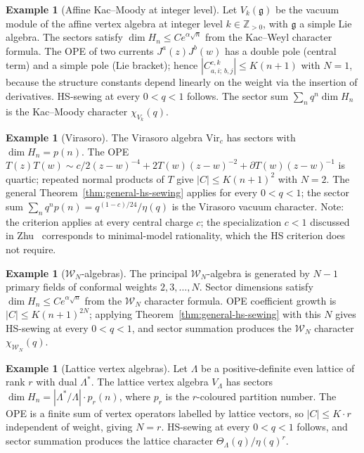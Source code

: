 \documentclass[11pt,reqno]{amsart}
\theoremstyle{definition}
\newtheorem{example}[theorem]{Example}
\theoremstyle{remark}
\newcommand{\cW}{\mathcal{W}}
\newcommand{\Vir}{\mathrm{Vir}}
\newcommand{\fg}{\mathfrak{g}}
\numberwithin{equation}{section}
\begin{document}
\begin{example}[Affine Kac--Moody at integer level]
\label{ex:kac-moody}
Let $V_k(\fg)$ be the vacuum module of the affine vertex algebra
at integer level $k \in \mathbb{Z}_{> 0}$, with $\fg$ a simple
Lie algebra. The sectors satisfy
$\dim H_n \leq C e^{\alpha\sqrt n}$ from the Kac--Weyl character
formula. The OPE of two currents
$J^a(z)J^b(w)$ has a double pole (central term) and a simple
pole (Lie bracket); hence
$|C^{c,k}_{a,i;\,b,j}| \leq K(n+1)$ with $N = 1$, because the
structure constants depend linearly on the weight via the
insertion of derivatives. HS-sewing at every $0 < q < 1$
follows. The sector sum
$\sum_n q^n\dim H_n$ is the Kac--Moody character $\chi_{V_k}(q)$.
\end{example}

\begin{example}[Virasoro]\label{ex:virasoro}
The Virasoro algebra $\Vir_c$ has sectors with
$\dim H_n = p(n)$. The OPE
$T(z)T(w) \sim c/2(z-w)^{-4} + 2T(w)(z-w)^{-2}
+ \partial T(w)(z-w)^{-1}$
is quartic; repeated normal products of $T$ give
$|C| \leq K(n+1)^2$ with $N = 2$. The general
Theorem~\ref{thm:general-hs-sewing} applies for every
$0 < q < 1$; the sector sum
$\sum_n q^n p(n) = q^{(1-c)/24}/\eta(q)$
is the Virasoro vacuum character. Note: the criterion
applies at every central charge $c$; the specialization
$c < 1$ discussed in Zhu~\cite{Zhu96} corresponds to
minimal-model rationality, which the HS criterion does not
require.
\end{example}

\begin{example}[$\cW_N$-algebras]\label{ex:wn}
The principal $\cW_N$-algebra is generated by $N - 1$ primary
fields of conformal weights $2, 3, \ldots, N$. Sector
dimensions satisfy $\dim H_n \leq C e^{\alpha\sqrt n}$ from
the $\cW_N$ character formula. OPE coefficient growth is
$|C| \leq K(n+1)^{2N}$; applying
Theorem~\ref{thm:general-hs-sewing} with this $N$ gives
HS-sewing at every $0 < q < 1$, and sector summation
produces the $\cW_N$ character $\chi_{\cW_N}(q)$.
\end{example}

\begin{example}[Lattice vertex algebras]\label{ex:lattice}
Let $\Lambda$ be a positive-definite even lattice of rank $r$
with dual $\Lambda^*$. The lattice vertex algebra $V_\Lambda$
has sectors
$\dim H_n = |\Lambda^*/\Lambda|\cdot p_r(n)$, where $p_r$ is the
$r$-coloured partition number. The OPE is a finite sum of
vertex operators labelled by lattice vectors, so
$|C| \leq K \cdot r$ independent of weight, giving $N = r$.
HS-sewing at every $0 < q < 1$ follows, and sector summation
produces the lattice character
$\Theta_\Lambda(q)/\eta(q)^r$.
\end{example}
\end{document}
